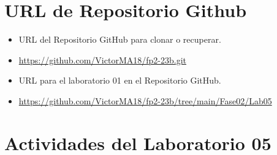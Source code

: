\documentclass{article}
\begin{document}
	\section{URL de Repositorio Github}
	\begin{itemize}
		\item URL del Repositorio GitHub para clonar o recuperar.
		\item \url{https://github.com/VictorMA18/fp2-23b.git}
		\item URL para el laboratorio 01 en el Repositorio GitHub.
		\item \url{https://github.com/VictorMA18/fp2-23b/tree/main/Fase02/Lab05}
	\end{itemize}
	
	\section{Actividades del Laboratorio 05}
	
\end{document}
